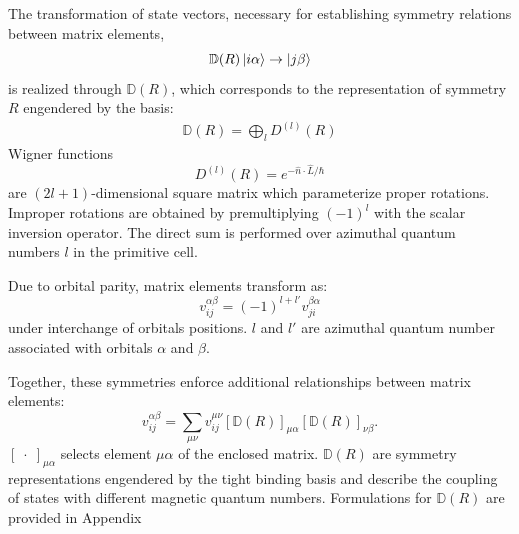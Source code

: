 \documentclass[twocolumn,showpacs,preprintnumbers,superscriptaddress,prb,floatfix,aps,10pt]{revtex4-1}
\newcommand*{\wignerD}{\mathbb{D}(R)}
\newcommand*{\wignerDl}{D^{(l)}(R)}
\begin{document}
 
The transformation of state vectors, necessary for establishing symmetry relations between matrix elements,  
%
\begin{equation}
\wignerD \ket{i\alpha} \rightarrow \ket{j\beta}
\end{equation}
%
is realized through $\wignerD$, which corresponds to the representation of symmetry $R$ engendered by the basis:
%
\begin{align}
\wignerD = \bigoplus_l \wignerDl
\end{align}
%
Wigner functions
\begin{equation}
\wignerDl = e^{- \hat{n} \cdot \hat{L} /\hbar}
\end{equation}
are $(2l+1)$-dimensional square matrix which parameterize proper rotations. %
Improper rotations are obtained by premultiplying $(-1)^l$ with the scalar inversion operator. \cite{sharma_general_1979,el-batanouny_symmetry_2008} The direct sum is performed over azimuthal quantum numbers $l$ in the primitive cell. 



 
 
 
 
 
 
 Due to orbital parity, matrix elements transform as:
%
\begin{equation}
\label{eq:intrinsic}
v_{ij}^{\alpha\beta} = (-1)^{l+l'}v_{ji}^{\beta\alpha}
\end{equation}
%
under interchange of orbitals positions. $l$ and $l'$ are azimuthal quantum number associated with orbitals $\alpha$ and $\beta$. 


%


Together, these symmetries enforce additional relationships between matrix elements:
%
\begin{equation}
\label{eq:stab}
v_{ij}^{\alpha\beta} = \sum_{\mu\nu} v_{ij}^{\mu\nu} \left[\wignerD\right]_{\mu\alpha} \left[\wignerD\right]_{\nu\beta}.
\end{equation}
%
$\left[\phantom{.}\cdot\phantom{.}\right]_{\mu\alpha}$ selects element $\mu\alpha$ of the enclosed matrix. $\wignerD$ are symmetry representations engendered by the tight binding basis and describe the coupling of states with different magnetic quantum numbers. Formulations for $\wignerD$ are provided in Appendix 
\end{document}
